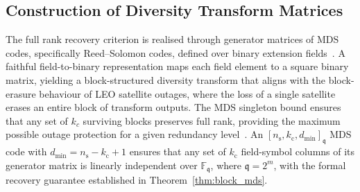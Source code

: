 \documentclass[lettersize,journal]{IEEEtran}
\begin{document}
\subsection{Construction of Diversity Transform Matrices}
\label{sec:diversity_transform_construction}
The full rank recovery criterion is realised through generator 
matrices of MDS codes, specifically 
Reed--Solomon codes, defined over binary extension 
fields~\cite{Seroussi1986}. A faithful field-to-binary representation 
maps each field element to a square binary matrix, yielding a 
block-structured diversity transform that aligns with the 
block-erasure behaviour of LEO satellite outages, where the loss of 
a single satellite erases an entire block of transform outputs. The 
MDS singleton bound ensures that any set of $k_c$ surviving blocks preserves full rank, providing the maximum possible outage protection for a given redundancy level~\cite{Roth2006,HuffmanPless2003}. An 
$[n_{\mathrm{s}},k_{\mathrm{c}},d_{\min}]_{\mathfrak{q}}$ MDS code 
with $d_{\min} = n_{\mathrm{s}}-k_{\mathrm{c}}+1$ ensures that any 
set of $k_{\mathrm{c}}$ field-symbol columns of its generator matrix 
is linearly independent over $\mathbb{F}_{\mathfrak{q}}$, where 
$\mathfrak{q} = 2^{m}$, with the formal recovery guarantee 
established in Theorem~\ref{thm:block_mds}.
\end{document}
